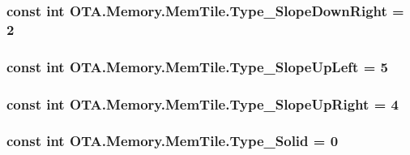 \subsubsection[{Type\+\_\+\+Slope\+Down\+Right}]{\setlength{\rightskip}{0pt plus 5cm}const int O\+T\+A.\+Memory.\+Mem\+Tile.\+Type\+\_\+\+Slope\+Down\+Right = 2}\label{class_o_t_a_1_1_memory_1_1_mem_tile_a82a9d4f7fee99bc1ea1dfda32b2052b6}
\hypertarget{class_o_t_a_1_1_memory_1_1_mem_tile_ab7939f53a56a80e46788806b68403b1a}{}
\subsubsection[{Type\+\_\+\+Slope\+Up\+Left}]{\setlength{\rightskip}{0pt plus 5cm}const int O\+T\+A.\+Memory.\+Mem\+Tile.\+Type\+\_\+\+Slope\+Up\+Left = 5}\label{class_o_t_a_1_1_memory_1_1_mem_tile_ab7939f53a56a80e46788806b68403b1a}
\hypertarget{class_o_t_a_1_1_memory_1_1_mem_tile_a3555a64eca1eb5e4a274ab13bff1ded4}{}
\subsubsection[{Type\+\_\+\+Slope\+Up\+Right}]{\setlength{\rightskip}{0pt plus 5cm}const int O\+T\+A.\+Memory.\+Mem\+Tile.\+Type\+\_\+\+Slope\+Up\+Right = 4}\label{class_o_t_a_1_1_memory_1_1_mem_tile_a3555a64eca1eb5e4a274ab13bff1ded4}
\hypertarget{class_o_t_a_1_1_memory_1_1_mem_tile_ae988cf404371e98a5b5bb5b2e37e7696}{}
\subsubsection[{Type\+\_\+\+Solid}]{\setlength{\rightskip}{0pt plus 5cm}const int O\+T\+A.\+Memory.\+Mem\+Tile.\+Type\+\_\+\+Solid = 0}\label{class_o_t_a_1_1_memory_1_1_mem_tile_ae988cf404371e98a5b5bb5b2e37e7696}


